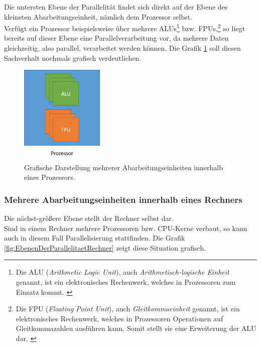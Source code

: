 				Die untersten Ebene der Parallelität findet sich direkt auf der Ebene des kleinsten Abarbeitungseinheit, nämlich dem Prozessor selbst.\\
				Verfügt ein Prozessor beispielsweise über mehrere ALUs\footnote{Die ALU (\textit{Arithmetic Logic Unit}), auch \textit{Arithmetisch-logische Einheit} genannt, ist ein elektronisches Rechenwerk, welches in Prozessoren zum Einsatz kommt. \cite{ALUWikipedia}} bzw. FPUs,\footnote{Die FPU (\textit{Floating Point Unit}), auch \textit{Gleitkommaeinheit} genannt, ist ein elektronisches Rechenwerk, welches in Prozessoren Operationen auf Gleitkommazahlen ausführen kann. Somit stellt sie eine Erweiterung der ALU dar. \cite{FPUWikipedia}} so liegt bereits auf dieser Ebene eine Parallelverarbeitung vor, da mehrere Daten gleichzeitig, also parallel, verarbeitet werden können. Die Grafik \ref{fig:EbenenDerParallelitaetProzessor} soll diesen Sachverhalt nochmals grafisch verdeutlichen. \cite{GrundlagenParallelisierungKegel}
				
				\begin{figure}
					\centering	
					\includegraphics[width=4cm]{Abbildungen/Ebenen_der_Parallelitaet_Prozessor.png}
					\caption{Grafische Darstellung mehrerer Abarbeitungseinheiten innerhalb eines Prozessors.}
					\label{fig:EbenenDerParallelitaetProzessor}
				\end{figure}
			
			\subsubsection{Mehrere Abarbeitungseinheiten innerhalb eines Rechners}
				\label{MehrereAbarbeitungseinheitenRechner}
			
				Die nächst-größere Ebene stellt der Rechner selbst dar.\\
				Sind in einem Rechner mehrere Prozessoren bzw. CPU-Kerne verbaut, so kann auch in diesem Fall Parallelisierung stattfinden. Die Grafik \ref{fig:EbenenDerParallelitaetRechner} zeigt diese Situation grafisch. \cite{GrundlagenParallelisierungKegel}
				
